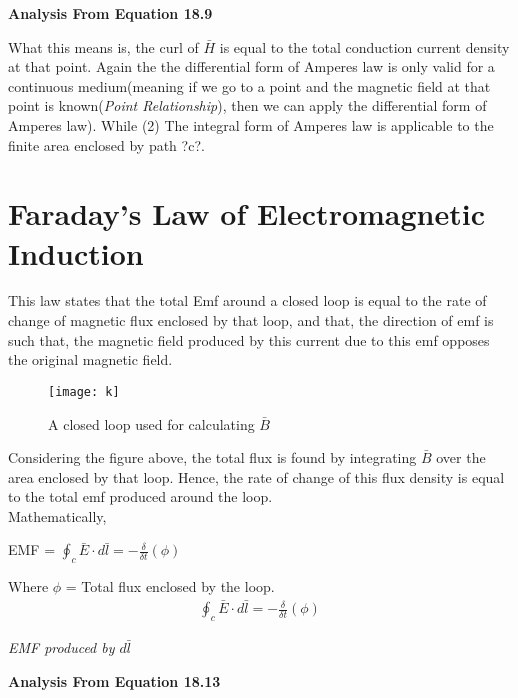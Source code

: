 \begin{flushleft}	
	\textbf{Analysis From Equation 18.9}
\end{flushleft}
What this means is, the curl of $\bar{H}$ is equal to the total conduction current density at that point. Again the the differential form of Amperes law is only valid for a continuous medium(meaning if we go to a point and the magnetic field at that point is known(\emph{Point Relationship}), then we can apply the differential form of Amperes law). While
(2)	The integral form of Amperes law is applicable to the finite area enclosed by path ?c?.\\

\section{Faraday's Law of Electromagnetic Induction} 
This law states that the total Emf around a closed loop is equal to the rate of change of magnetic flux enclosed by that loop, and that, the direction of emf is such that, the magnetic field produced by this current due to this emf opposes the original magnetic field.\\

\begin{figure}
	\centering
	\texttt{[image: k]}
	\caption{A closed loop used for calculating $\bar{B}$}
	\label{fig:k}
\end{figure}


	Considering the figure above, the total flux is found by integrating $\bar{B}$ over the area enclosed by that loop. Hence, the rate of change of this flux density is equal to the total emf produced around the loop.\\
	Mathematically,\\
	\begin{center}
		EMF = $\oint_c\bar{E} \cdot d\bar{l} = -\frac{\delta}{\delta t}(\phi)$
	\end{center}
	
	Where $\phi$ = Total flux enclosed by the loop.\\
	\begin{align}
	\boxed{\oint_c\bar{E} \cdot d\bar{l} = -\frac{\delta}{\delta t}(\phi)}
	\end{align}
	
	\begin{center}
		\emph{EMF produced by $d\bar{l}$}
	\end{center} 
	
	\begin{flushleft}
		\textbf{Analysis From Equation 18.13}
	\end{flushleft}
	
